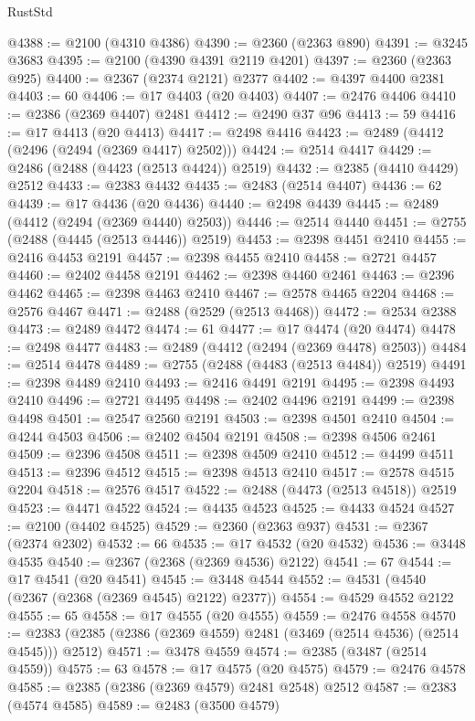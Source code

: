 \begin{lexlean}{RustStd}
\begin{coremodule}
{\begin{coremodule}
{{{{{{{{{{{{{{{{{{{{{{{{{{{{{{{{{{{{{{{{{{{{{{{{{{@4388 := @2100 (@4310 @4386)
@4390 := @2360 (@2363 @890)
@4391 := @3245 @3683
@4395 := @2100 (@4390 @4391 @2119 @4201)
@4397 := @2360 (@2363 @925)
@4400 := @2367 (@2374 @2121) @2377
@4402 := @4397 @4400 @2381
@4403 := 60
@4406 := @17 @4403 (@20 @4403)
@4407 := @2476 @4406
@4410 := @2386 (@2369 @4407) @2481
@4412 := @2490 @37 @96
@4413 := 59
@4416 := @17 @4413 (@20 @4413)
@4417 := @2498 @4416
@4423 := @2489 (@4412 (@2496 (@2494 (@2369 @4417) @2502)))
@4424 := @2514 @4417
@4429 := @2486 (@2488 (@4423 (@2513 @4424)) @2519)
@4432 := @2385 (@4410 @4429) @2512
@4433 := @2383 @4432
@4435 := @2483 (@2514 @4407)
@4436 := 62
@4439 := @17 @4436 (@20 @4436)
@4440 := @2498 @4439
@4445 := @2489 (@4412 (@2494 (@2369 @4440) @2503))
@4446 := @2514 @4440
@4451 := @2755 (@2488 (@4445 (@2513 @4446)) @2519)
@4453 := @2398 @4451 @2410
@4455 := @2416 @4453 @2191
@4457 := @2398 @4455 @2410
@4458 := @2721 @4457
@4460 := @2402 @4458 @2191
@4462 := @2398 @4460 @2461
@4463 := @2396 @4462
@4465 := @2398 @4463 @2410
@4467 := @2578 @4465 @2204
@4468 := @2576 @4467
@4471 := @2488 (@2529 (@2513 @4468))
@4472 := @2534 @2388
@4473 := @2489 @4472
@4474 := 61
@4477 := @17 @4474 (@20 @4474)
@4478 := @2498 @4477
@4483 := @2489 (@4412 (@2494 (@2369 @4478) @2503))
@4484 := @2514 @4478
@4489 := @2755 (@2488 (@4483 (@2513 @4484)) @2519)
@4491 := @2398 @4489 @2410
@4493 := @2416 @4491 @2191
@4495 := @2398 @4493 @2410
@4496 := @2721 @4495
@4498 := @2402 @4496 @2191
@4499 := @2398 @4498
@4501 := @2547 @2560 @2191
@4503 := @2398 @4501 @2410
@4504 := @4244 @4503
@4506 := @2402 @4504 @2191
@4508 := @2398 @4506 @2461
@4509 := @2396 @4508
@4511 := @2398 @4509 @2410
@4512 := @4499 @4511
@4513 := @2396 @4512
@4515 := @2398 @4513 @2410
@4517 := @2578 @4515 @2204
@4518 := @2576 @4517
@4522 := @2488 (@4473 (@2513 @4518)) @2519
@4523 := @4471 @4522
@4524 := @4435 @4523
@4525 := @4433 @4524
@4527 := @2100 (@4402 @4525)
@4529 := @2360 (@2363 @937)
@4531 := @2367 (@2374 @2302)
@4532 := 66
@4535 := @17 @4532 (@20 @4532)
@4536 := @3448 @4535
@4540 := @2367 (@2368 (@2369 @4536) @2122)
@4541 := 67
@4544 := @17 @4541 (@20 @4541)
@4545 := @3448 @4544
@4552 := @4531 (@4540 (@2367 (@2368 (@2369 @4545) @2122) @2377))
@4554 := @4529 @4552 @2122
@4555 := 65
@4558 := @17 @4555 (@20 @4555)
@4559 := @2476 @4558
@4570 := @2383 (@2385 (@2386 (@2369 @4559) @2481 (@3469 (@2514 @4536) (@2514 @4545))) @2512)
@4571 := @3478 @4559
@4574 := @2385 (@3487 (@2514 @4559))
@4575 := 63
@4578 := @17 @4575 (@20 @4575)
@4579 := @2476 @4578
@4585 := @2385 (@2386 (@2369 @4579) @2481 @2548) @2512
@4587 := @2383 (@4574 @4585)
@4589 := @2483 (@3500 @4579)
}}}}}}}}}}}}}}}}}}}}}}}}}}}}}}}}}}}}}}}}}}}}}}}}}}
\end{coremodule}}
\end{coremodule}
\end{lexlean}
